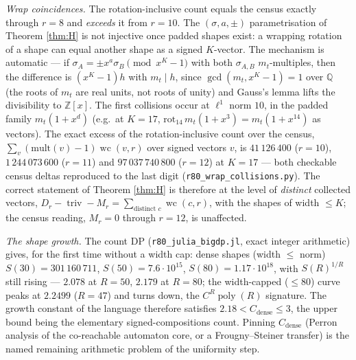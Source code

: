 \emph{Wrap coincidences.}  The rotation-inclusive count equals the census
exactly through $r=8$ and \emph{exceeds} it from $r=10$.  The
$(\sigma,a,\pm)$ parametrisation of Theorem \ref{thm:H} is not injective
once padded shapes exist: a wrapping rotation of a shape can equal another
shape as a signed $K$-vector.  The mechanism is automatic --- if
$\sigma_A=\pm x^a\sigma_B \pmod{x^K-1}$ with both $\sigma_{A,B}$
$m_t$-multiples, then the difference is $(x^K-1)h$ with $m_t\mid h$, since
$\gcd(m_t,x^K-1)=1$ over $\mathbb Q$ (the roots of $m_t$ are real units,
not roots of unity) and Gauss's lemma lifts the divisibility to
$\mathbb Z[x]$.  The first collisions occur at $\ell^1$ norm $10$, in the
padded family $m_t(1+x^d)$ (e.g.\ at $K=17$,
$\mathrm{rot}_{14}\,m_t(1+x^3)=m_t(1+x^{14})$ as vectors).  The exact
excess of the rotation-inclusive count over the census,
$\sum_v(\mathrm{mult}(v)-1)\operatorname{wc}(v,r)$ over signed vectors $v$,
is $41\,126\,400$ ($r=10$), $1\,244\,073\,600$ ($r=11$) and
$97\,037\,740\,800$ ($r=12$) at $K=17$ --- both checkable census deltas
reproduced to the last digit (\texttt{r80\_wrap\_collisions.py}).  The
correct statement of Theorem \ref{thm:H} is therefore at the level of
\emph{distinct} collected vectors,
$D_r-\operatorname{triv}-M_r=\sum_{\text{distinct }c}\operatorname{wc}(c,r)$,
with the shapes of width $\le K$; the census reading, $M_r=0$ through
$r=12$, is unaffected.

\emph{The shape growth.}  The count DP (\texttt{r80\_julia\_bigdp.jl},
exact integer arithmetic) gives, for the first time without a width cap:
dense shapes (width $\le$ norm) $S(30)=301\,160\,711$, $S(50)=7.6\cdot
10^{15}$, $S(80)=1.17\cdot10^{18}$, with $S(R)^{1/R}$ still rising ---
$2.078$ at $R=50$, $2.179$ at $R=80$; the width-capped ($\le80$) curve
peaks at $2.2499$ ($R=47$) and turns down, the $C^R\operatorname{poly}(R)$
signature.  The growth constant of the language therefore satisfies
$2.18<C_{\mathrm{dense}}\le3$, the upper bound being the elementary
signed-compositions count.  Pinning $C_{\mathrm{dense}}$ (Perron analysis
of the co-reachable automaton core, or a Frougny--Steiner transfer) is the
named remaining arithmetic problem of the uniformity step.
